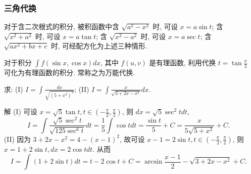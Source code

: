 \documentclass[lang=cn,newtx,10pt,scheme=chinese]{elegantbook}
\begin{document}
    \subsubsection{三角代换}
    对于含二次根式的积分, 被积函数中含 $\sqrt{a^2 - x^2}$ 时, 可设 $x = a \sin t$; 含 $\sqrt{x^2 + a^2}$ 时, 可设 $x = a \tan t$; 含 $\sqrt{x^2 - a^2}$ 时, 可设 $x = a \sec t$; 含 $\sqrt{ax^2 + bx + c}$ 时, 可经配方化为上述三种情形.

对于积分 $\int f(\sin x, \cos x) dx$, 其中 $f(u, v)$ 是有理函数, 利用代换 $t = \tan \frac{x}{2}$ 可化为有理函数的积分. 常称之为万能代换.
\begin{example}
  求: (I) $I = \int \frac{dx}{\sqrt{(5 + x^2)^3}}$; (II) $I = \int \frac{x}{\sqrt{3 + 2x - x^2}} dx$.
\end{example}
\begin{solution}
  解 (I) 可设 $x = \sqrt{5} \tan t, t \in (-\frac{\pi}{2}, \frac{\pi}{2})$, 则 $dx = \sqrt{5} \sec^2 t dt$,
  $$
  I = \int \frac{\sqrt{5} \sec^2 t}{\sqrt{125 \sec^6 t}} dt = \frac{1}{5} \int \cos t dt = \frac{\sin t}{5} + C = \frac{x}{5\sqrt{5 + x^2}} + C.
  $$
  (II) 因为 $3 + 2x - x^2 = 4 - (x - 1)^2$, 故可设 $x - 1 = 2 \sin t, t \in (-\frac{\pi}{2}, \frac{\pi}{2})$, 则 $x = 1 + 2 \sin t, dx = 2 \cos t dt$. 从而
  $$
  I = \int (1 + 2 \sin t) dt = t - 2 \cos t + C = \arcsin \frac{x - 1}{2} - \sqrt{3 + 2x - x^2} + C.
  $$
\end{solution}
\end{document}
